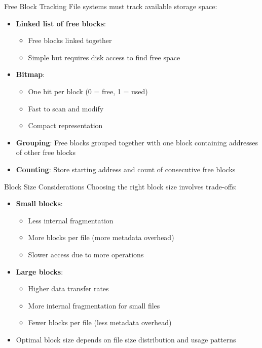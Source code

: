 \begin{theorem}{Free Block Tracking}
    File systems must track available storage space:
    \begin{itemize}
        \item \textbf{Linked list of free blocks}:
            \begin{itemize}
                \item Free blocks linked together
                \item Simple but requires disk access to find free space
            \end{itemize}
        \item \textbf{Bitmap}:
            \begin{itemize}
                \item One bit per block (0 = free, 1 = used)
                \item Fast to scan and modify
                \item Compact representation
            \end{itemize}
        \item \textbf{Grouping}: Free blocks grouped together with one block containing addresses of other free blocks
        \item \textbf{Counting}: Store starting address and count of consecutive free blocks
    \end{itemize}
\end{theorem}

\begin{corollary}{Block Size Considerations}
    Choosing the right block size involves trade-offs:
    \begin{itemize}
        \item \textbf{Small blocks}:
            \begin{itemize}
                \item Less internal fragmentation
                \item More blocks per file (more metadata overhead)
                \item Slower access due to more operations
            \end{itemize}
        \item \textbf{Large blocks}:
            \begin{itemize}
                \item Higher data transfer rates
                \item More internal fragmentation for small files
                \item Fewer blocks per file (less metadata overhead)
            \end{itemize}
        \item Optimal block size depends on file size distribution and usage patterns
    \end{itemize}
\end{corollary}

